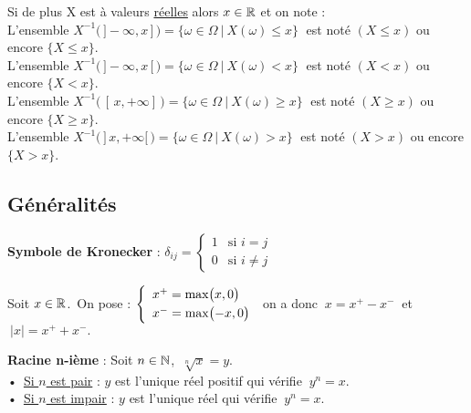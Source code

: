 Si de plus X est à valeurs \underline{réelles} alors \(x\in \mathbb{R}\) et on note :\vspace{0.1cm}\\
L'ensemble \(X^{-1}\bigl(\,]-\infty,x\,]\,\bigr)=\{\omega\in \Omega \ \rvert \ X(\omega)\leq x\}\;\) est noté \((X\leq x)\) ou encore \(\{X\leq x\}\).\vspace{0.1cm}\\
L'ensemble \(X^{-1}\bigl(\,]-\infty,x\,[\,\bigr)=\{\omega\in \Omega \ \rvert \ X(\omega)< x\}\;\) est noté \((X< x)\) ou encore \(\{X< x\}\).\vspace{0.1cm}\\
L'ensemble \(X^{-1}\bigl(\,[\,x,+\infty]\,\bigr)=\{\omega\in \Omega \ \rvert \ X(\omega)\geq x\}\;\) est noté \((X\geq x)\) ou encore \(\{X\geq x\}\).\vspace{0.1cm}\\
L'ensemble \(X^{-1}\bigl(\,]\,x,+\infty[\,\bigr)=\{\omega\in \Omega \ \rvert \ X(\omega)> x\}\;\) est noté \((X> x)\) ou encore \(\{X> x\}\).

\vspace{1cm}

\subsection{Généralités}

\vspace{0.8cm}

\textbf{Symbole de Kronecker} : \(\delta_{ij}=\left\{ \begin{array}{cc}
    1 & \text{si } i=j \\
    0 & \text{si } i\neq j
\end{array} \right. \)

\vspace{1.2cm}

\noindent Soit \(x\in \mathbb{R}\).\,  On pose : \(\left\{ 
\begin{array}{l}
    x^+=\max\bigl(x,0\bigr) \vspace{0.1cm}\\
    x^-=\max \bigl(-x,0\bigr)
\end{array} \right. \) \hspace{0.3cm} on a donc \(\ x=x^+-x^-\ \) et \(\ |x|=x^++x^-.\)


\vspace{1.2cm}

\textbf{Racine n-ième} : Soit \(n\in \mathbb{N}\)\expo{*}, \(\displaystyle\ \sqrt[n]{x}=y. \)\vspace{0.1cm}\\
•\, \underline{Si $n$ est pair} : $y$ est l'unique réel positif qui vérifie \(\:y^n=x.\)\vspace{0.2cm}\\
•\, \underline{Si $n$ est impair} : $y$ est l'unique réel qui vérifie \(\:y^n=x.\)

